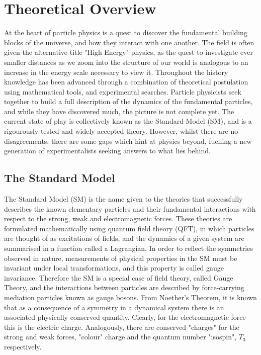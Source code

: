 \chapter{Theoretical Overview}

At the heart of particle physics is a quest to discover the fundamental building blocks of the universe, and how they interact with one another. The field is often given the alternative title "High Energy" physics, as the quest to investigate ever smaller distances as we zoom into the structure of our world is analogous to an increase in the energy scale necessary to view it. Throughout the history knowledge has been advanced through a combination of theoretical postulation using mathematical tools, and experimental searches. Particle physicists seek together to build a full description of the dynamics of the fundamental particles, and while they have discovered much, the picture is not complete yet. The current state of play is collectively known as the Standard Model (SM), and is a rigourously tested and widely accepted theory. However, whilst there are no disagreements, there are some gaps which hint at physics beyond, fuelling a new generation of experimentalists seeking answers to what lies behind.

\section{The Standard Model}

The Standard Model (SM) is the name given to the theories that successfully describes the known elementary particles and their fundamental interactions with respect to the strong, weak and electromagnetic forces.  These theories are formulated mathematically using quantum field theory (QFT), in which particles are thought of as excitations of fields, and the dynamics of a given system are summarised in a function called a Lagrangian. In order to reflect the symmetries observed in nature, measurements of physical properties in the SM must be invariant under local transformations, and this property is called gauge invariance. Therefore the SM is a special case of field theory, called Gauge Theory, and the interactions between particles are described by force-carrying mediation particles known as gauge bosons. From Noether's Theorem, it is known that as a consequence of a symmetry in a dynamical system there is an associated physically conserved quantity. Clearly, for the electromagnetic force this is the electric charge. Analogously, there are conserved "charges" for the strong and weak forces, "colour" charge and the quantum number "isospin", $T_{3}$ respectively. 
 

